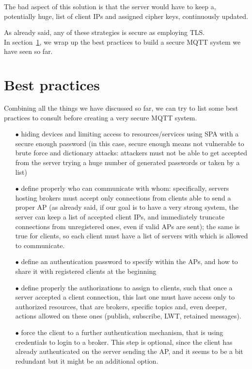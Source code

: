 \documentclass[12pt]{report}
\begin{document}
{{\begin{itemize}
The bad aspect of this solution is that the server would have to keep a, potentially huge, list of client IPs and assigned cipher keys, continuously updated.\\
\end{itemize}

As already said, any of these strategies is secure as employing TLS.\\

In section~\ref{sec:mqttbestpractices}, we wrap up the best practices to build a secure MQTT system we have seen so far.\\

\section{Best practices}
\label{sec:mqttbestpractices}
\bigskip
Combining all the things we have discussed so far, we can try to list some best practices to consult before creating a very secure MQTT system.
\bigskip
\begin{itemize}
\setlength{\itemindent}{+4mm}
\item[$\bullet$] hiding devices and limiting access to resources/services using SPA with a secure enough password (in this case, secure enough means not vulnerable to brute force and dictionary attacks: attackers must not be able to get accepted from the server trying a huge number of generated passwords or taken by a list)
\item[$\bullet$] define properly who can communicate with whom: specifically, servers hosting brokers must accept only connections from clients able to send a proper AP (as already said, if our goal is to have a very strong system, the server can keep a list of accepted client IPs, and immediately truncate connections from unregistered ones, even if valid APs are sent); the same is true for clients, so each client must have a list of servers with which is allowed to communicate.
\item[$\bullet$] define an authentication password to specify within the APs, and how to share it with registered clients at the beginning
\item[$\bullet$] define properly the authorizations to assign to clients, such that once a server accepted a client connection, this last one must have access only to authorized resources, that are brokers, specific topics and, even deeper, actions allowed on these ones (publish, subscribe, LWT, retained messages).
\item[$\bullet$] force the client to a further authentication mechanism, that is using credentials to login to a broker. This step is optional, since the client has already authenticated on the server sending the AP, and it seems to be a bit redundant but it might be an additional option.

\end{itemize}}}
\end{document}
